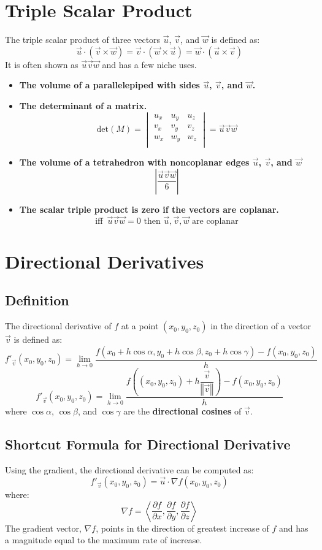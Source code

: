 \documentclass[a4paper,12pt,openany]{book}
\newcommand{\tsp}[3]{
    \vec{#1}\vec{#2}\vec{#3}
}
\newcommand{\abs}[1]{
    \left\vert#1\right\vert
}
\newcommand{\magn}[1]{
    \left\Vert#1\right\Vert
}
\begin{document}
\section{Triple Scalar Product}
The triple scalar product of three vectors \(\vec{u}\), \(\vec{v}\), and \(\vec{w}\) is defined as:
\[
    \vec{u} \cdot (\vec{v} \times \vec{w}) = \vec{v} \cdot (\vec{w} \times \vec{u}) = \vec{w} \cdot (\vec{u} \times \vec{v})
\]
It is often shown as $\tsp{u}{v}{w}$ and has a few niche uses.
\begin{itemize}
    \item \textbf{The volume of a parallelepiped with sides \(\vec{u}\), \(\vec{v}\), and \(\vec{w}\).}
    \item \textbf{The determinant of a matrix.}
    \[\text{det}(M) = 
    \begin{vmatrix}
        u_x & u_y & u_z \\
        v_x & v_y & v_z \\
        w_x & w_y & w_z \\
    \end{vmatrix}
        = \tsp{u}{v}{w}
    \]
    \item \textbf{The volume of a tetrahedron with noncoplanar edges \(\vec{u}\), \(\vec{v}\), and \(\vec{w}\)}
        \[
            \abs{\dfrac{\tsp{u}{v}{w}}{6}}
        \]
    \item \textbf{The scalar triple product is zero if the vectors are coplanar.} 
        \[
            \text{iff }\, \tsp{u}{v}{w} = 0 \text{ then } \vec{u}, \vec{v}, \vec{w} \text{ are coplanar}
        \]
\end{itemize}
\section{Directional Derivatives}
\subsection{Definition}
The directional derivative of \(f\) at a point \((x_0, y_0, z_0)\) in the direction of a vector \(\vec{v}\) is defined as:
\[
    f'_{\vec{v}}(x_0, y_0, z_0) = 
    \lim_{h \to 0}
    \dfrac{
        f(x_0 + h \cos \alpha, y_0 + h \cos \beta, z_0 + h \cos \gamma) - f(x_0, y_0, z_0)
    }{h}
\]
\[
    f'_{\vec{v}}(x_0, y_0, z_0) = 
    \lim_{h \to 0}
    \dfrac{
        f((x_0, y_0, z_0) + h\dfrac{\vec{v}}{\magn{\vec{v}}}) - f(x_0, y_0, z_0)}{h}
\]
where \(\cos \alpha\), \(\cos \beta\), and \(\cos \gamma\) are the \textbf{directional cosines} of \(\vec{v}\).

\subsection{Shortcut Formula for Directional Derivative}
Using the gradient, the directional derivative can be computed as:
\[
    f'_{\vec{v}}(x_0, y_0, z_0) = \vec{u} \cdot \nabla f(x_0, y_0, z_0)
\]
where:
\[
    \nabla f = \left\langle \dfrac{\partial f}{\partial x}, \dfrac{\partial f}{\partial y}, \dfrac{\partial f}{\partial z} \right\rangle
\]
The gradient vector, \(\nabla f\), points in the direction of greatest increase of \(f\) and has a magnitude equal to the maximum rate of increase.
\end{document}
